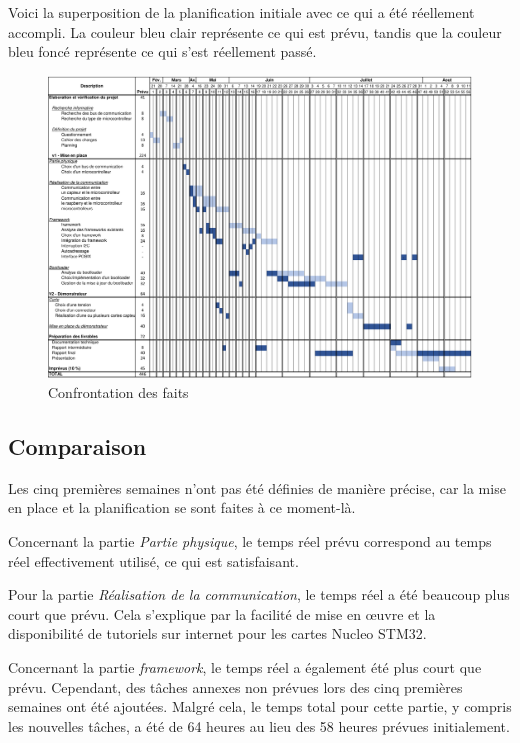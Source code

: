 Voici la superposition de la planification initiale avec ce qui a été réellement accompli. La couleur bleu clair représente ce qui est prévu, tandis que la couleur bleu foncé représente ce qui s'est réellement passé.

\begin{figure}[H]
    \centering
    \includegraphics[angle=90,origin=c,scale=0.54]{./assets/files/planning_reel.pdf}
    \caption{Confrontation des faits}
\end{figure}

\newpage
\subsection{Comparaison}

Les cinq premières semaines n'ont pas été définies de manière précise, car la mise en place et la planification se sont faites à ce moment-là.

Concernant la partie \textit{Partie physique}, le temps réel prévu correspond au temps réel effectivement utilisé, ce qui est satisfaisant.

Pour la partie \textit{Réalisation de la communication}, le temps réel a été beaucoup plus court que prévu.
Cela s'explique par la facilité de mise en \oe{}uvre et la disponibilité de tutoriels sur internet pour les cartes Nucleo STM32.

Concernant la partie \textit{\gls{framework}}, le temps réel a également été plus court que prévu.
Cependant, des tâches annexes non prévues lors des cinq premières semaines ont été ajoutées.
Malgré cela, le temps total pour cette partie, y compris les nouvelles tâches, a été de 64 heures au lieu des 58 heures prévues initialement.


